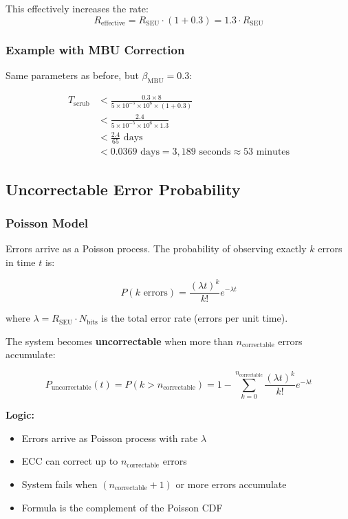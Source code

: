 \documentclass[11pt,a4paper]{article}
\begin{document}
This effectively increases the rate:
\begin{equation}
R_{\text{effective}} = R_{\text{SEU}} \cdot (1 + 0.3) = 1.3 \cdot R_{\text{SEU}}
\end{equation}

\subsubsection{Example with MBU Correction}

Same parameters as before, but $\beta_{\text{MBU}} = 0.3$:

\begin{align}
T_{\text{scrub}} &< \frac{0.3 \times 8}{5 \times 10^{-5} \times 10^6 \times (1 + 0.3)} \\
&< \frac{2.4}{5 \times 10^{-5} \times 10^6 \times 1.3} \\
&< \frac{2.4}{65} \text{ days} \\
&< 0.0369 \text{ days} = 3{,}189 \text{ seconds} \approx 53 \text{ minutes}
\end{align}

\subsection{Uncorrectable Error Probability}

\subsubsection{Poisson Model}

Errors arrive as a Poisson process. The probability of observing exactly $k$ errors in time $t$ is:

\begin{equation}
P(k \text{ errors}) = \frac{(\lambda t)^k}{k!} e^{-\lambda t}
\end{equation}

where $\lambda = R_{\text{SEU}} \cdot N_{\text{bits}}$ is the total error rate (errors per unit time).

The system becomes \textbf{uncorrectable} when more than $n_{\text{correctable}}$ errors accumulate:

\begin{equation}
P_{\text{uncorrectable}}(t) = P(k > n_{\text{correctable}}) = 1 - \sum_{k=0}^{n_{\text{correctable}}} \frac{(\lambda t)^k}{k!} e^{-\lambda t}
\end{equation}

\textbf{Logic:}
\begin{itemize}
    \item Errors arrive as Poisson process with rate $\lambda$
    \item ECC can correct up to $n_{\text{correctable}}$ errors
    \item System fails when $(n_{\text{correctable}} + 1)$ or more errors accumulate
    \item Formula is the complement of the Poisson CDF
\end{itemize}
\end{document}

